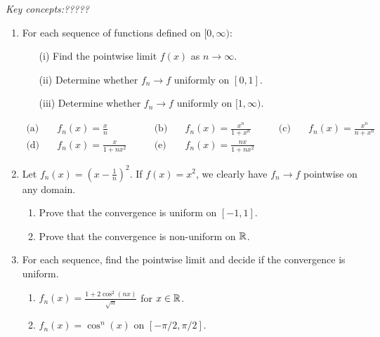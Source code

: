 \begin{exercises}
	\emph{Key concepts:\quad ?????}
	
	\begin{enumerate}
		\item\label{exs:uniform1} For each sequence of functions defined on $[0,\infty)$:
		\begin{enumerate}
	    \item[(i)] Find the pointwise limit $f(x)$ as $n\to\infty$.
	    \item[(ii)] Determine whether $f_n\to f$ uniformly on $[0,1]$.
	    \item[(iii)] Determine whether $f_n\to f$ uniformly on $[1,\infty)$.
	  \end{enumerate}\vspace{-12pt}
	  \begin{align*}
	  \text{(a)}&\quad f_n(x)=\frac xn\qquad 
	  &\text{(b)}&\quad f_n(x)=\frac{x^n}{1+x^n}\qquad
	  &\text{(c)}&\quad f_n(x)=\frac{x^n}{n+x^n}\\[4pt]
	  \text{(d)}&\quad f_n(x)=\frac x{1+nx^2}\qquad
	  &\text{(e)}&\quad f_n(x)=\frac{nx}{1+nx^2}
	  \end{align*}
	 	
	 	\item Let $f_n(x)=\left(x-\frac 1n\right)^2$. If $f(x)=x^2$, we clearly have $f_n\to f$ pointwise on any domain.
	 	\begin{enumerate}
	 	  \item Prove that the convergence is uniform on $[-1,1]$.
	 	  \item Prove that the convergence is non-uniform on $\mathbb{R}$.
	 	\end{enumerate}
	  
	  \item For each sequence, find the pointwise limit and decide if the convergence is uniform.
	  \begin{enumerate}
	    \item $f_n(x)=\frac{1+2\cos^2(nx)}{\sqrt n}$ for $x\in\mathbb{R}$.
	    \item $f_n(x)=\cos^n(x)$ on $[-\pi/2,\pi/2]$.
	  \end{enumerate}
	 	

\end{enumerate}
\end{exercises}
